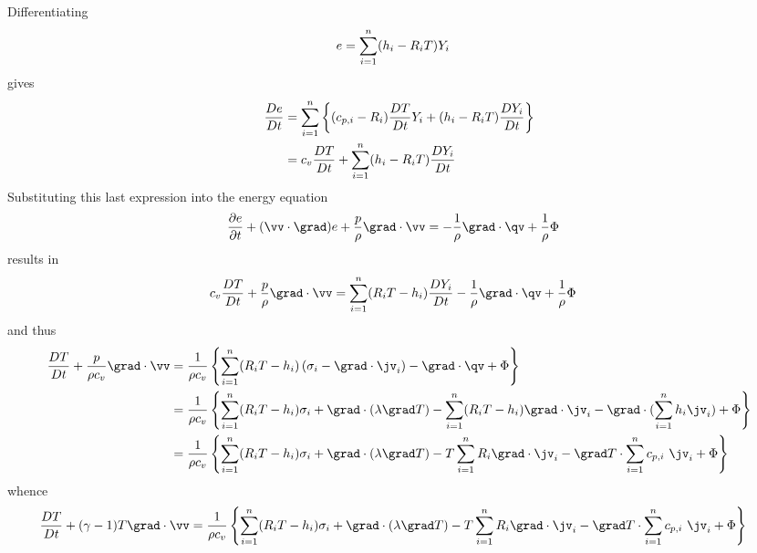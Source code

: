 \documentclass[10pt]{article}
\begin{document}
Differentiating
\begin{align*}
  e &= \sum_{i=1}^n( h_i - R_i T)Y_i 
\end{align*}
gives
\begin{align*}
  {D e\over Dt} &= \sum_{i=1}^n\left\{ (c_{p,i}-R_i){D T\over Dt} Y_i + (h_i-R_i T){D Y_i\over Dt} \right\} \\
                &= c_v {D T\over Dt} + \sum_{i=1}^n  (h_i-R_i T){D Y_i\over Dt}  
\end{align*}
Substituting this last expression into the energy equation
\begin{align*}
   {\partial e  \over \partial t}  + (\vv\cdot\grad)e + {p\over\rho}\grad\cdot\vv
           &= -{1\over\rho} \grad\cdot\qv  + {1\over\rho}\Phi 
\end{align*}
results in
\begin{align*}
  c_v {D T\over Dt} + {p\over\rho}\grad\cdot\vv & = \sumi  (R_i T-h_i){D Y_i\over Dt}
                 -{1\over\rho} \grad\cdot\qv  + {1\over\rho}\Phi \label{eq:Ta}
\end{align*}
and thus
\begin{align*}
  {D T\over Dt} + {p\over\rho c_v}\grad\cdot\vv & = 
       {1\over \rho c_v}  \left\{ \sumi  (R_i T-h_i)\left( \sigma_i -\grad\cdot \jv_i \right) 
           - \grad\cdot\qv  + \Phi \right\} \\
   & = {1\over \rho c_v}  \left\{ \sumi  (R_i T-h_i) \sigma_i + \grad\cdot(\lambda\grad T)
      -\sumi  (R_i T-h_i) \grad\cdot\jv_i - \grad\cdot( \sumi h_i \jv_i)
              + \Phi \right\} \\
   & = {1\over \rho c_v}  \left\{ \sumi  (R_i T-h_i) \sigma_i + \grad\cdot(\lambda\grad T)
      - T \sumi  R_i \grad\cdot\jv_i - \grad T \cdot\sumi c_{p,i} ~\jv_i
              + \Phi \right\} 
\end{align*}
whence
\begin{align*}
  {D T\over Dt} + (\gamma-1) T \grad\cdot\vv & = 
       {1\over \rho c_v}  \left\{ \sumi  (R_i T-h_i) \sigma_i + \grad\cdot(\lambda\grad T)
      - T \sumi  R_i \grad\cdot\jv_i - \grad T \cdot\sumi c_{p,i} ~ \jv_i
              + \Phi \right\} 
\end{align*}
\end{document}
